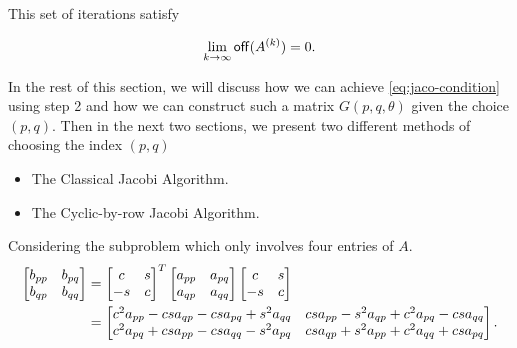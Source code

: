 This set of iterations satisfy

\begin{equation}
  \label{eq:jaco-condition}
  \lim_{k\to\infty}\mathsf{off}(A^{(k)}) = 0.
\end{equation}

In the rest of this section, we will discuss how we can achieve \eqref{eq:jaco-condition} using step 2 and how we can construct such a matrix $G(p,q,\theta)$ given the choice $(p,q)$. Then in the next two sections, we present two different methods of choosing the index $(p,q)$
\begin{itemize}
  \item The Classical Jacobi Algorithm.
  \item The Cyclic-by-row Jacobi Algorithm.
\end{itemize}

Considering the subproblem which only involves four entries of $A$.
\begin{equation}
    \label{eq:2.2}
    \begin{aligned}
        \begin{bmatrix}
            b_{pp} & b_{pq} \\ b_{qp} & b_{qq}
        \end{bmatrix} &= 
        \begin{bmatrix}
            c & s \\ -s & c
        \end{bmatrix}^T 
        \begin{bmatrix}
            a_{pp} & a_{pq} \\ a_{qp} & a_{qq}
        \end{bmatrix} 
        \begin{bmatrix}
            c & s \\ -s & c
        \end{bmatrix}\\
        & = 
        \begin{bmatrix}
            c^2a_{pp} - cs a_{qp} - cs a_{pq} + s^2a_{qq} &
            cs a_{pp} - s^2 a_{qp} + c^2 a_{pq} - csa_{qq}\\
            c^2a_{pq} + csa_{pp} - csa_{qq} - s^2 a_{pq} &
            csa_{qp} + s^2 a_{pp} + c^2 a_{qq} + csa_{pq}
        \end{bmatrix}.
    \end{aligned}
\end{equation}

